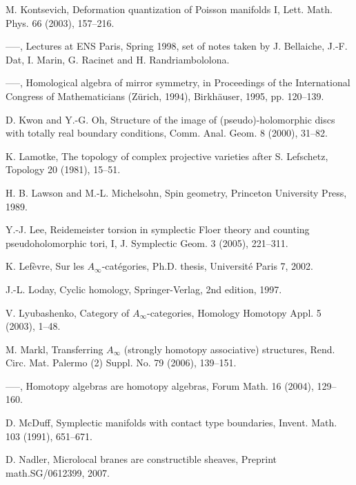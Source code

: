 \begin{list}{}{\setlength{\leftmargin}{3em}\setlength{\labelwidth}{2.5em}\setlength{\itemsep}{.5em}\small}
\item[\hypertarget{bib:88}{[88]}] M. Kontsevich, Deformation quantization of Poisson manifolds I, Lett. Math. Phys. 66 (2003), 157–216. 
\item[\hypertarget{bib:89}{[89]}] —–, Lectures at ENS Paris, Spring 1998, set of notes taken by J. Bellaiche, J.-F. Dat, I. Marin, G. Racinet and H. Randriambololona. 
\item[\hypertarget{bib:90}{[90]}] —–, Homological algebra of mirror symmetry, in Proceedings of the International Congress of Mathematicians (Zürich, 1994), Birkhäuser, 1995, pp. 120–139. 
\item[\hypertarget{bib:91}{[91]}] D. Kwon and Y.-G. Oh, Structure of the image of (pseudo)-holomorphic discs with totally real boundary conditions, Comm. Anal. Geom. 8 (2000), 31–82. 
\item[\hypertarget{bib:92}{[92]}] K. Lamotke, The topology of complex projective varieties after S. Lefschetz, Topology 20 (1981), 15–51. 
\item[\hypertarget{bib:93}{[93]}] H. B. Lawson and M.-L. Michelsohn, Spin geometry, Princeton University Press, 1989. 
\item[\hypertarget{bib:94}{[94]}] Y.-J. Lee, Reidemeister torsion in symplectic Floer theory and counting pseudoholomorphic tori, I, J. Symplectic Geom. 3 (2005), 221–311. 
\item[\hypertarget{bib:95}{[95]}] K. Lefèvre, Sur les $A_\infty$-catégories, Ph.D. thesis, Université Paris 7, 2002. 
\item[\hypertarget{bib:96}{[96]}] J.-L. Loday, Cyclic homology, Springer-Verlag, 2nd edition, 1997. 
\item[\hypertarget{bib:97}{[97]}] V. Lyubashenko, Category of $A_\infty$-categories, Homology Homotopy Appl. 5 (2003), 1–48. 
\item[\hypertarget{bib:98}{[98]}] M. Markl, Transferring $A_\infty$ (strongly homotopy associative) structures, Rend. Circ. Mat. Palermo (2) Suppl. No. 79 (2006), 139–151. 
\item[\hypertarget{bib:99}{[99]}] —–, Homotopy algebras are homotopy algebras, Forum Math. 16 (2004), 129–160. 
\item[\hypertarget{bib:100}{[100]}] D. McDuff, Symplectic manifolds with contact type boundaries, Invent. Math. 103 (1991), 651–671. 
\item[\hypertarget{bib:101}{[101]}] D. Nadler, Microlocal branes are constructible sheaves, Preprint math.SG/0612399, 2007. 

\end{list}
